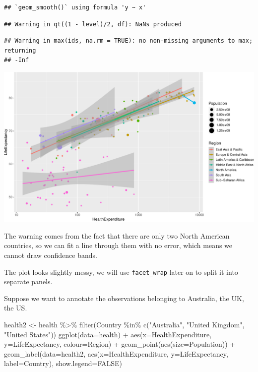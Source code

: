 \documentclass[
]{book}
\newenvironment{Shaded}{\begin{snugshade}}{\end{snugshade}}
\newcommand{\AttributeTok}[1]{\textcolor[rgb]{0.77,0.63,0.00}{#1}}
\newcommand{\ConstantTok}[1]{\textcolor[rgb]{0.00,0.00,0.00}{#1}}
\newcommand{\FunctionTok}[1]{\textcolor[rgb]{0.00,0.00,0.00}{#1}}
\newcommand{\NormalTok}[1]{#1}
\newcommand{\OtherTok}[1]{\textcolor[rgb]{0.56,0.35,0.01}{#1}}
\newcommand{\SpecialCharTok}[1]{\textcolor[rgb]{0.00,0.00,0.00}{#1}}
\newcommand{\StringTok}[1]{\textcolor[rgb]{0.31,0.60,0.02}{#1}}
\begin{document}
\begin{verbatim}
## `geom_smooth()` using formula 'y ~ x'
\end{verbatim}

\begin{verbatim}
## Warning in qt((1 - level)/2, df): NaNs produced
\end{verbatim}

\begin{verbatim}
## Warning in max(ids, na.rm = TRUE): no non-missing arguments to max; returning
## -Inf
\end{verbatim}

\includegraphics[width=\textwidth]{bookdown-demo_files/figure-latex/unnamed-chunk-55-1}

The warning comes from the fact that there are only two North American countries, so we can fit a line through them with no error, which means we cannot draw confidence bands.

The plot looks slightly messy, we will use \texttt{facet\_wrap} later on to split it into separate panels.

Suppose we want to annotate the observations belonging to Australia, the UK, the US.

\begin{Shaded}
\begin{Highlighting}[]
\NormalTok{health2 }\OtherTok{\textless{}{-}}\NormalTok{ health }\SpecialCharTok{\%\textgreater{}\%}
    \FunctionTok{filter}\NormalTok{(Country }\SpecialCharTok{\%in\%} \FunctionTok{c}\NormalTok{(}\StringTok{"Australia"}\NormalTok{, }\StringTok{"United Kingdom"}\NormalTok{, }\StringTok{"United States"}\NormalTok{))}
\FunctionTok{ggplot}\NormalTok{(}\AttributeTok{data=}\NormalTok{health) }\SpecialCharTok{+} 
    \FunctionTok{aes}\NormalTok{(}\AttributeTok{x=}\NormalTok{HealthExpenditure,  }\AttributeTok{y=}\NormalTok{LifeExpectancy, }\AttributeTok{colour=}\NormalTok{Region) }\SpecialCharTok{+}
    \FunctionTok{geom\_point}\NormalTok{(}\FunctionTok{aes}\NormalTok{(}\AttributeTok{size=}\NormalTok{Population)) }\SpecialCharTok{+}
    \FunctionTok{geom\_label}\NormalTok{(}\AttributeTok{data=}\NormalTok{health2, }
               \FunctionTok{aes}\NormalTok{(}\AttributeTok{x=}\NormalTok{HealthExpenditure,  }\AttributeTok{y=}\NormalTok{LifeExpectancy, }\AttributeTok{label=}\NormalTok{Country),}
               \AttributeTok{show.legend=}\ConstantTok{FALSE}\NormalTok{)}
\end{Highlighting}
\end{Shaded}
\end{document}
